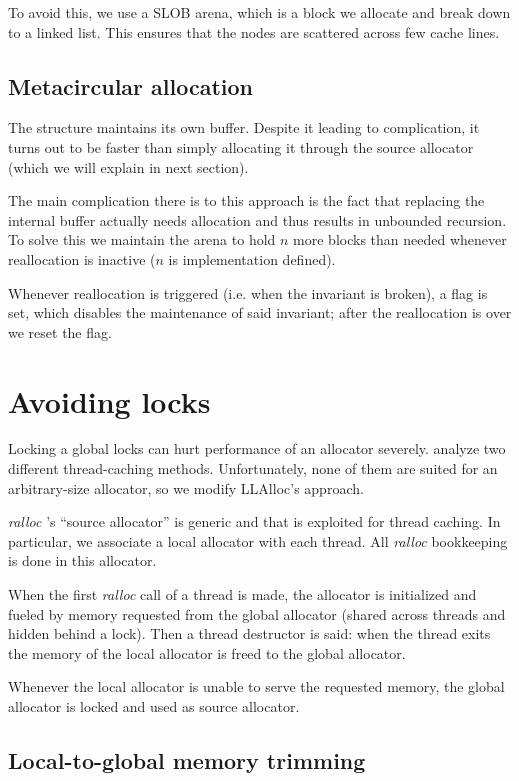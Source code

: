 \documentclass[11pt]{article}
\newcommand{\ralloc}{\emph{ralloc} }
\begin{document}
    To avoid this, we use a SLOB arena, which is a block we allocate and break
    down to a linked list. This ensures that the nodes are scattered across few
    cache lines.

    \subsection{Metacircular allocation}
    The structure maintains its own buffer. Despite it leading to complication,
    it turns out to be faster than simply allocating it through the source
    allocator (which we will explain in next section).

    The main complication there is to this approach is the fact that replacing
    the internal buffer actually needs allocation and thus results in unbounded
    recursion. To solve this we maintain the arena to hold $ n $ more blocks
    than needed whenever reallocation is inactive ($ n $ is implementation
    defined).

    Whenever reallocation is triggered (i.e. when the invariant is broken), a
    flag is set, which disables the maintenance of said invariant; after the
    reallocation is over we reset the flag.

    \section{Avoiding locks}
    Locking a global locks can hurt performance of an allocator severely.
    \cite{manghwani05} analyze two different thread-caching methods.
    Unfortunately, none of them are suited for an arbitrary-size allocator, so
    we modify LLAlloc's approach.

    \ralloc's ``source allocator'' is generic and that is exploited for thread
    caching. In particular, we associate a local allocator with each thread.
    All \ralloc bookkeeping is done in this allocator.

    When the first \ralloc call of a thread is made, the allocator is
    initialized and fueled by memory requested from the global allocator
    (shared across threads and hidden behind a lock). Then a thread destructor
    is said: when the thread exits the memory of the local allocator is freed
    to the global allocator.

    Whenever the local allocator is unable to serve the requested memory, the
    global allocator is locked and used as source allocator.

    \subsection{Local-to-global memory trimming}
\end{document}
